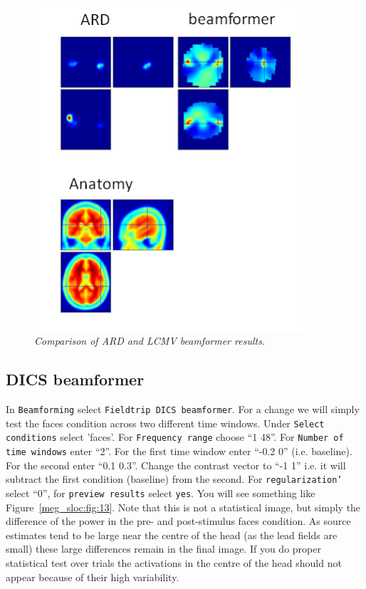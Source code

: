 \begin{figure}
\begin{center}
\includegraphics[width=100mm]{meg_sloc/slide12}
\caption{\em Comparison of ARD and LCMV beamformer results.\label{meg_sloc:fig:12}}
\end{center}
\end{figure}

\subsection{DICS beamformer}
In \texttt{Beamforming} select \texttt{Fieldtrip DICS beamformer}. For a change we will simply test the faces condition across two different time windows. Under \texttt{Select conditions} select 'faces'. For \texttt{Frequency range} choose ``1 48''. For \texttt{Number of time windows} enter ``2''. For the first time window enter ``-0.2 0'' (i.e. baseline). For the second enter ``0.1 0.3''. Change the contrast vector to ``-1 1'' i.e. it will subtract the first condition (baseline) from the second. For \texttt{regularization'} select ``0'', for \texttt{preview results} select \texttt{yes}. You will see something like Figure~\ref{meg_sloc:fig:13}. Note that this is not a statistical image, but simply the difference of the power in the pre- and post-stimulus faces condition.  As source estimates tend to be large near the centre of the head (as the lead fields are small) these large differences remain in the final image. If you do proper statistical test over trials the activations in the centre of the head should not appear because of their high variability.


